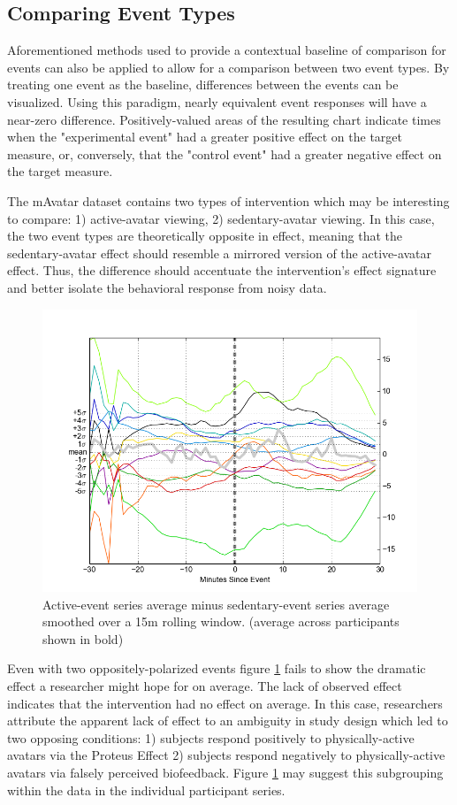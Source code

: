 \subsection{Comparing Event Types}
Aforementioned methods used to provide a contextual baseline of comparison for events can also be applied to allow for a comparison between two event types.
By treating one event as the baseline, differences between the events can be visualized.
Using this paradigm, nearly equivalent event responses will have a near-zero difference.
Positively-valued areas of the resulting chart indicate times when the "experimental event" had a greater positive effect on the target measure, or, conversely, that the "control event" had a greater negative effect on the target measure.


The mAvatar dataset contains two types of intervention which may be interesting to compare: 1) active-avatar viewing, 2) sedentary-avatar viewing.
In this case, the two event types are theoretically opposite in effect, meaning that the sedentary-avatar effect should resemble a mirrored version of the active-avatar effect.
Thus, the difference should accentuate the intervention's effect signature and better isolate the behavioral response from noisy data.

\begin{figure}
\centering
\includegraphics[width=0.9\columnwidth]{./img/mAvatar_difference_events_smooth15m.png}
\caption{Active-event series average minus sedentary-event series average smoothed over a 15m rolling window. (average across participants shown in bold)}
\label{fig:mAvatarDifference}
\end{figure}

Even with two oppositely-polarized events figure \ref{fig:mAvatarDifference} fails to show the dramatic effect a researcher might hope for on average.
The lack of observed effect indicates that the intervention had no effect on average.
In this case, researchers attribute the apparent lack of effect to an ambiguity in study design which led to two opposing conditions: 1) subjects respond positively to physically-active avatars via the Proteus Effect \cite{yee2009proteus} 2) subjects respond negatively to physically-active avatars via falsely perceived biofeedback.
Figure \ref{fig:mAvatarDifference} may suggest this subgrouping within the data in the individual participant series.

